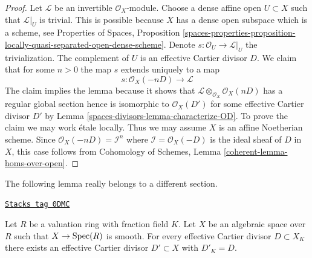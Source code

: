\begin{proof}
Let $\mathcal{L}$ be an invertible $\mathcal{O}_X$-module.
Choose a dense affine open $U \subset X$ such that
$\mathcal{L}|_U$ is trivial. This is possible because
$X$ has a dense open subspace which is a scheme, see
Properties of Spaces, Proposition
\ref{spaces-properties-proposition-locally-quasi-separated-open-dense-scheme}.
Denote $s : \mathcal{O}_U \to \mathcal{L}|_U$ the trivialization.
The complement of $U$ is an effective Cartier divisor
$D$. We claim that for some $n > 0$ the map $s$ extends uniquely to a map
$$
s : \mathcal{O}_X(-nD) \longrightarrow \mathcal{L}
$$
The claim implies the lemma because it shows that
$\mathcal{L} \otimes_{\mathcal{O}_X} \mathcal{O}_X(nD)$
has a regular global section hence is isomorphic to
$\mathcal{O}_X(D')$ for some effective Cartier divisor $D'$
by Lemma \ref{spaces-divisors-lemma-characterize-OD}.
To prove the claim we may work \'etale locally. Thus we may assume
$X$ is an affine Noetherian scheme. Since
$\mathcal{O}_X(-nD) = \mathcal{I}^n$ where $\mathcal{I} = \mathcal{O}_X(-D)$
is the ideal sheaf of $D$ in $X$, this case follows from
Cohomology of Schemes, Lemma \ref{coherent-lemma-homs-over-open}.
\end{proof}

The following lemma really belongs to a different section.

\begin{lemma}
\label{spaces-divisors-lemma-smooth-over-valuation-ring-effective-Cartier}
\href{https://stacks.math.columbia.edu/tag/0DMC}{\texttt{Stacks tag 0DMC}}

Let $R$ be a valuation ring with fraction field $K$.
Let $X$ be an algebraic space over $R$ such that $X \to \operatorname{Spec}(R)$
is smooth. For every effective Cartier divisor $D \subset X_K$
there exists an effective Cartier divisor $D' \subset X$
with $D'_K = D$.
\end{lemma}

